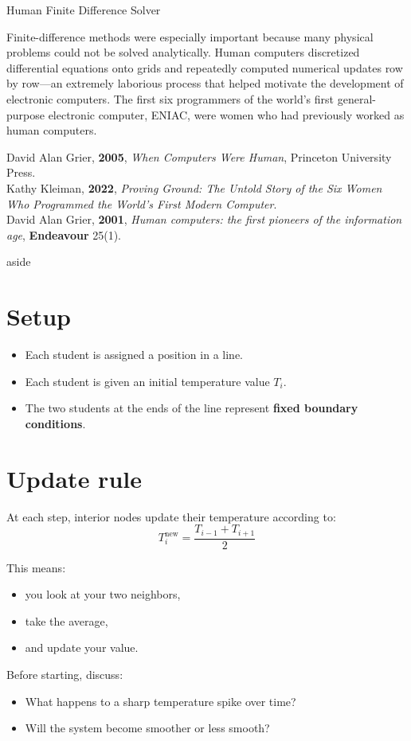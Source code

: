 \begin{activity}{Human Finite Difference Solver}
{    Finite-difference methods were especially important because many physical problems could not be solved analytically. Human computers discretized differential equations onto grids and repeatedly computed numerical updates row by row—an extremely laborious process that helped motivate the development of electronic computers. The first six programmers of the world's first general-purpose electronic computer, ENIAC, were women who had previously worked as human computers.

    David Alan Grier, \textbf{2005}, \textit{When Computers Were Human}, Princeton University Press. \\
    Kathy Kleiman, \textbf{2022}, \textit{Proving Ground: The Untold Story of the Six Women Who Programmed the World's First Modern Computer}. \\
    David Alan Grier, \textbf{2001}, \textit{Human computers: the first pioneers of the information age}, \textbf{Endeavour} 25(1).
}{aside}

\section*{Setup}

\begin{itemize}
    \item Each student is assigned a position in a line.
    \item Each student is given an initial temperature value $T_i$.
    \item The two students at the ends of the line represent \textbf{fixed
    boundary conditions}.
\end{itemize}

\section*{Update rule}
At each step, interior nodes update their temperature according to:
\begin{equation}
    T_i^{\text{new}} = \frac{T_{i-1} + T_{i+1}}{2}
\end{equation}

This means:
\begin{itemize}
    \item you look at your two neighbors,
    \item take the average,
    \item and update your value.
\end{itemize}

\begin{questions}
    Before starting, discuss:
    \begin{itemize}
        \item What happens to a sharp temperature spike over time?
        \item Will the system become smoother or less smooth?
    \end{itemize}
    \answerbox[3cm]


\end{questions}
\end{activity}

